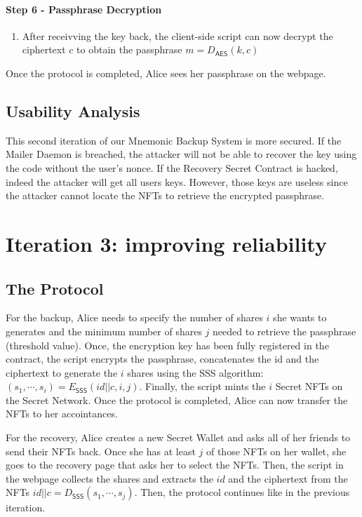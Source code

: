 \documentclass[12pt]{article}
\newcommand{\ms}[1]{\ensuremath{\mathsf{#1}}}
\begin{document}
\begin{enumerate}
\paragraph{Step 6 - Passphrase Decryption}

\begin{enumerate}[label=6.\arabic*]
  \item After receivving the key back, the client-side script can now decrypt the ciphertext $c$ to obtain the passphrase $m=D_{\ms{AES}}(k, c)$
\end{enumerate}

Once the protocol is completed, Alice sees her passphrase on the webpage.

\subsection{Usability Analysis}

This second iteration of our Mnemonic Backup System is more secured. If the Mailer Daemon is breached, the attacker will not be able to recover the key using the code without the user's nonce. If the Recovery Secret Contract is hacked, indeed the attacker will get all users keys. However, those keys are useless since the attacker cannot locate the NFTs to retrieve the encrypted passphrase.

\section{Iteration 3: improving reliability}

\subsection{The Protocol}

For the backup, Alice needs to specify the number of shares $i$ she wants to generates and the minimum number of shares $j$ needed to retrieve the passphrase (threshold value). Once, the encryption key has been fully registered in the contract, the script encrypts the passphrase, concatenates the id and the ciphertext to generate the $i$ shares using the SSS algorithm: $(s_1,\cdots,s_i)=E_{\ms{SSS}}(id||c, i, j)$. Finally, the script mints the $i$ Secret NFTs on the Secret Network. Once the protocol is completed, Alice can now transfer the NFTs to her accointances. 

For the recovery, Alice creates a new Secret Wallet and asks all of her friends to send their NFTs back. Once she has at least $j$ of those NFTs on her wallet, she goes to the recovery page that asks her to select the NFTs. Then, the script in the webpage collects the shares and extracts the $id$ and the ciphertext from the NFTs $id||c = D_{\ms{SSS}}(s_1,\cdots,s_j)$. Then, the protocol continues like in the previous iteration. 


\end{enumerate}
\end{document}
